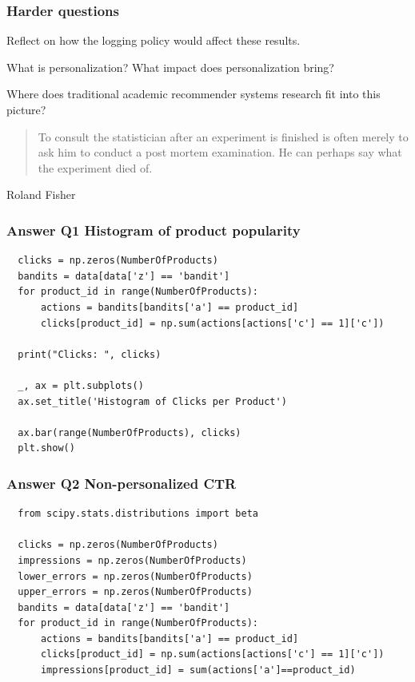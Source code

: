 \begin{frame}
  \frametitle{Harder questions}

Reflect on how the logging policy would affect these results.

\pause

What is personalization? What impact does personalization bring?

\pause

Where does traditional academic recommender systems research fit into this picture?  

\end{frame}


\begin{frame}
\begin{quote}
  To consult the statistician after an experiment is finished is often merely to ask him to conduct a post mortem examination. He can perhaps say what the experiment died of.
\end{quote}
Roland Fisher
\end{frame}

\begin{frame}[fragile]
  \frametitle{Answer Q1 Histogram of product popularity}
\begin{small}
\begin{verbatim}
  clicks = np.zeros(NumberOfProducts)
  bandits = data[data['z'] == 'bandit']
  for product_id in range(NumberOfProducts):
      actions = bandits[bandits['a'] == product_id]
      clicks[product_id] = np.sum(actions[actions['c'] == 1]['c'])
      
  print("Clicks: ", clicks)
  
  _, ax = plt.subplots()
  ax.set_title('Histogram of Clicks per Product')
  
  ax.bar(range(NumberOfProducts), clicks)
  plt.show()
\end{verbatim}
\end{small}
\end{frame}


\begin{frame}[fragile]
  \frametitle{Answer Q2 Non-personalized CTR}
\begin{tiny}
\begin{verbatim}
  from scipy.stats.distributions import beta

  clicks = np.zeros(NumberOfProducts)
  impressions = np.zeros(NumberOfProducts)
  lower_errors = np.zeros(NumberOfProducts)
  upper_errors = np.zeros(NumberOfProducts)
  bandits = data[data['z'] == 'bandit']
  for product_id in range(NumberOfProducts):
      actions = bandits[bandits['a'] == product_id]
      clicks[product_id] = np.sum(actions[actions['c'] == 1]['c'])
      impressions[product_id] = sum(actions['a']==product_id)
\end{verbatim}
\end{tiny}
\end{frame}

